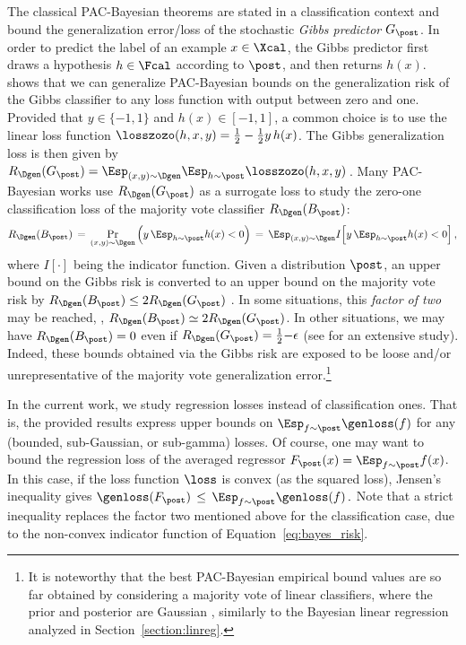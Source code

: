 \documentclass{article}
\theoremstyle{definition}
\theoremstyle{plain}
\begin{document}
The classical PAC-Bayesian theorems are stated in a classification context and bound the generalization error/loss of the stochastic \emph{Gibbs predictor} $G_\post$.
%
%
%
%
In order to predict the label of an example $x\in\Xcal$, the Gibbs predictor first draws a hypothesis $h\in\Fcal$ according to $\post$, and then returns $h(x)$.
\citet{maurer-04} shows that we can generalize PAC-Bayesian bounds on the generalization risk of the Gibbs classifier to any loss function with output between zero and one. 
%
Provided that $y\in\{-1,1\}$ and $h(x)\in[-1,1]$, a common choice is to use the linear loss function  $\losszozo(h,x,y) = \frac12 - \frac12 y\,h(x)$.
The Gibbs generalization loss is then given by
$R_\Dgen(G_\post) = \Esp_{(x,y)\sim\Dgen}  \Esp_{h\sim\post}  \losszozo(h,x,y) $\,.
%
%
%
%
%
%
Many PAC-Bayesian works use $R_\Dgen(G_\post)$ as a surrogate loss to study the zero-one classification loss of the majority vote classifier  $R_\Dgen(B_\post)$:
%
%
%
\begin{equation} \label{eq:bayes_risk} %
%
R_\Dgen(B_\post) 
\,=\, \Pr_{(x,y)\sim\Dgen} \Big( y\,\Esp_{h\sim\post}h(x) < 0 \Big)
\,=\, \Esp_{(x,y)\sim\Dgen} I\Big[ y\,\Esp_{h\sim\post}h(x) < 0 \Big]\,,
%
%
%
%
\end{equation} 
where $I[\cdot]$ being the indicator function. Given a distribution $\post$, %
an upper bound on the Gibbs risk is converted to an upper bound on the majority vote risk by $R_\Dgen(B_\post)\leq 2 R_\Dgen(G_\post)$ \citep{langford-02}.
In some situations, this \emph{factor of two} may be reached, \ie, $R_\Dgen(B_\post)\simeq 2 R_\Dgen(G_\post)$.
In other situations, we may have $R_\Dgen(B_\post)=0$ even if $R_\Dgen(G_\post) = \frac12{-}\epsilon$ (see \citet{graal-neverending} for an extensive study). 
Indeed, these bounds obtained via the Gibbs risk are exposed to be loose and/or unrepresentative of the majority vote generalization error.\footnote{It is noteworthy that the best PAC-Bayesian empirical bound values are so far obtained by considering a majority vote of linear classifiers, where the prior and posterior are Gaussian \citep{ambroladze-06,graal-icml09,langford-02}, similarly to  the Bayesian linear regression analyzed in Section~\ref{section:linreg}.} 

In the current work, we study regression losses instead of classification ones.
That is, the provided results express upper bounds on $\Esp_{f\sim\post} \genloss(f)$ for any (bounded, sub-Gaussian, or sub-gamma) losses. %
%
%
Of course, one may want to bound the regression loss of the averaged regressor $F_\post(x) = \Esp_{f\sim\post} f(x)$.  In this case, if the loss function $\loss$ is convex (as the squared loss), Jensen's inequality gives
%
$\genloss(F_\post)  \, \leq\, \Esp_{f\sim\post} \genloss(f)\,.$
%
Note that a strict inequality 
%
 replaces the factor two mentioned above for the classification case, due to the non-convex indicator function of Equation~\eqref{eq:bayes_risk}.
\end{document}
